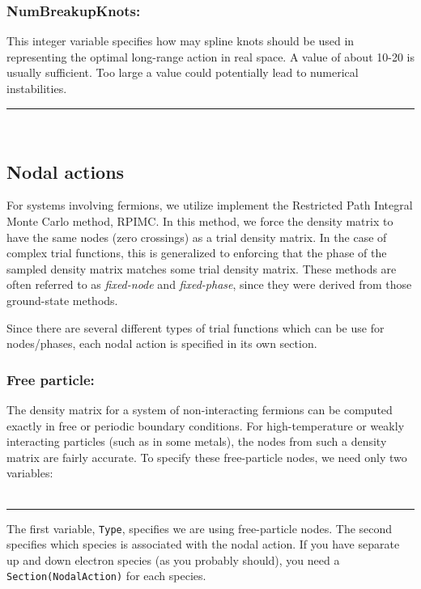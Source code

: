 \documentclass{book}
\begin{document}
\subsubsection{NumBreakupKnots:}
This integer variable specifies how may spline knots should be used in
representing the optimal long-range action in real space.  A value of
about 10-20 is usually sufficient.  Too large a value could
potentially lead to numerical instabilities.\\
\rule{0.0cm}{0.75cm}\rule{0.6cm}{0cm}\\



\subsection{Nodal actions}
For systems involving fermions, we utilize implement the Restricted
Path Integral Monte Carlo method, RPIMC.  In this method, we force the
density matrix to have the same nodes (zero crossings) as a trial
density matrix.  In the case of complex trial functions, this is
generalized to enforcing that the phase of the sampled density matrix
matches some trial density matrix.  These methods are often referred
to as {\em fixed-node} and {\em fixed-phase}, since they were derived
from those ground-state methods.  

Since there are several different types of trial functions which can
be use for nodes/phases, each nodal action is specified in its own
section.  
\subsubsection{Free particle:}
The density matrix for a system of non-interacting fermions can be
computed exactly in free or periodic boundary conditions.  For
high-temperature or weakly interacting particles (such as in some
metals), the nodes from such a density matrix are fairly accurate.  To
specify these free-particle nodes, we need only two variables: \\ \\
\rule{0.6cm}{0cm}
The first variable, \texttt{Type}, specifies we are using
free-particle nodes.  The second specifies which species is associated
with the nodal action.  If you have separate up and down electron
species (as you probably should), you need a
\texttt{Section(NodalAction)} for each species.
\end{document}
